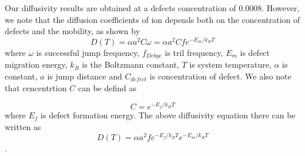 \documentclass[twocolumn,showpacs,preprintnumbers,amsmath,amssymb,superscriptaddress,prb]{revtex4}
\begin{document}
Our diffusivity results are obtained at a defects concentration of 0.0008. However, we note that the diffusion coefficients of ion depends both on the concentration of defects and the mobility, as shown by
\begin{equation}
D(T) = \alpha a^2 C \omega = \alpha a^2 C fe^{-E_m/k_{B}T} 
\end{equation}
where $\omega$ is successful jump frequency, $f_{Debye}$ is tril frequency, $E_m$ is defect migration energy, $k_B$ is the Boltzmann constant, $T$ is system temperature, $\alpha$ is constant, $a$ is jump distance and $C_{defect}$ is concentration of defect. We also note that cencentrtion $C$ can be defind as 

\begin{equation}
C = e^{-E_f/k_BT}
\end{equation} 
where $E_f$ is defect formation energy. The above diffusivity equation there can be written as 
\begin{equation}
D(T)  = \alpha a^2 f e^{-E_f/k_BT}e^{-E_m/k_{B}T} 
\end{equation}. 
 




\end{document}
